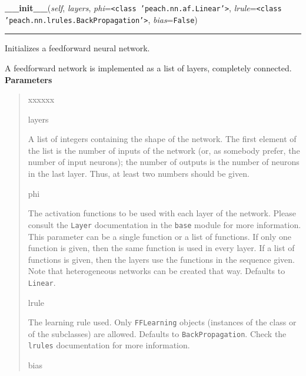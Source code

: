    \vspace{0.5ex}

\hspace{.8\funcindent}\begin{boxedminipage}{\funcwidth}

    \raggedright \textbf{\_\_init\_\_}(\textit{self}, \textit{layers}, \textit{phi}={\tt {\textless}class 'peach.nn.af.Linear'{\textgreater}}, \textit{lrule}={\tt {\textless}class 'peach.nn.lrules.BackPropagation'{\textgreater}}, \textit{bias}={\tt False})

    \vspace{-1.5ex}

    \rule{\textwidth}{0.5\fboxrule}
\setlength{\parskip}{2ex}

Initializes a feedforward neural network.

A feedforward network is implemented as a list of layers, completely
connected.
\setlength{\parskip}{1ex}
      \textbf{Parameters}
      \vspace{-1ex}

      \begin{quote}
        \begin{Ventry}{xxxxxx}

          \item[layers]


A list of integers containing the shape of the network. The first
element of the list is the number of inputs of the network (or, as
somebody prefer, the number of input neurons); the number of outputs
is the number of neurons in the last layer. Thus, at least two
numbers should be given.
          \item[phi]


The activation functions to be used with each layer of the network.
Please consult the \texttt{Layer} documentation in the \texttt{base} module
for more information. This parameter can be a single function or a
list of functions. If only one function is given, then the same
function is used in every layer. If a list of functions is given,
then the layers use the functions in the sequence given. Note that
heterogeneous networks can be created that way. Defaults to
\texttt{Linear}.
          \item[lrule]


The learning rule used. Only \texttt{FFLearning} objects (instances of
the class or of the subclasses) are allowed. Defaults to
\texttt{BackPropagation}. Check the \texttt{lrules} documentation for more
information.
          \item[bias]



\end{Ventry}
\end{quote}
\end{boxedminipage}
